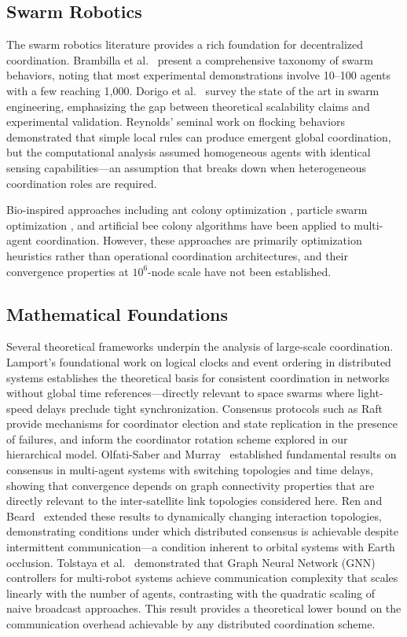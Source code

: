 \documentclass[journal]{IEEEtran}
\begin{document}
\subsection{Swarm Robotics}

The swarm robotics literature provides a rich foundation for decentralized coordination. Brambilla et al.~\cite{brambilla_2013} present a comprehensive taxonomy of swarm behaviors, noting that most experimental demonstrations involve 10--100 agents with a few reaching 1{,}000. Dorigo et al.~\cite{dorigo_2021} survey the state of the art in swarm engineering, emphasizing the gap between theoretical scalability claims and experimental validation. Reynolds' seminal work on flocking behaviors \cite{reynolds_1987} demonstrated that simple local rules can produce emergent global coordination, but the computational analysis assumed homogeneous agents with identical sensing capabilities---an assumption that breaks down when heterogeneous coordination roles are required.

Bio-inspired approaches including ant colony optimization \cite{dorigo_aco}, particle swarm optimization \cite{kennedy_pso}, and artificial bee colony algorithms \cite{karaboga_abc} have been applied to multi-agent coordination. However, these approaches are primarily optimization heuristics rather than operational coordination architectures, and their convergence properties at $10^6$-node scale have not been established.

\subsection{Mathematical Foundations}

Several theoretical frameworks underpin the analysis of large-scale coordination. Lamport's foundational work on logical clocks and event ordering in distributed systems \cite{lamport_clocks} establishes the theoretical basis for consistent coordination in networks without global time references---directly relevant to space swarms where light-speed delays preclude tight synchronization. Consensus protocols such as Raft \cite{ongaro_raft} provide mechanisms for coordinator election and state replication in the presence of failures, and inform the coordinator rotation scheme explored in our hierarchical model. Olfati-Saber and Murray~\cite{olfati_consensus} established fundamental results on consensus in multi-agent systems with switching topologies and time delays, showing that convergence depends on graph connectivity properties that are directly relevant to the inter-satellite link topologies considered here. Ren and Beard~\cite{ren_beard} extended these results to dynamically changing interaction topologies, demonstrating conditions under which distributed consensus is achievable despite intermittent communication---a condition inherent to orbital systems with Earth occlusion. Tolstaya et al.~\cite{tolstaya_gnn} demonstrated that Graph Neural Network (GNN) controllers for multi-robot systems achieve communication complexity that scales linearly with the number of agents, contrasting with the quadratic scaling of naive broadcast approaches. This result provides a theoretical lower bound on the communication overhead achievable by any distributed coordination scheme.
\end{document}
